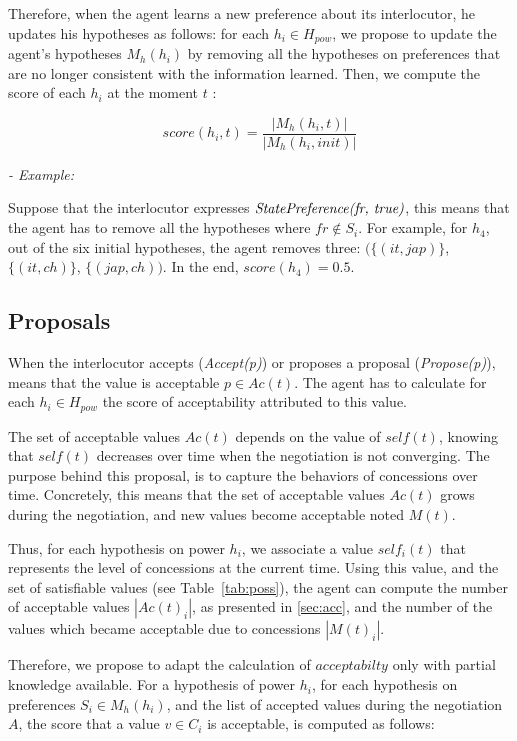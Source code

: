 \documentclass[conference, letterpaper]{IEEEtran}
\begin{document}
		Therefore, when the agent learns a new preference about its interlocutor, he updates his hypotheses as follows: 
		for each  $h_i \in H_{pow}$, we propose to update the agent's hypotheses $M_h(h_i)$ by removing all the hypotheses on preferences that are no longer consistent with the information learned. 
		Then, we compute the score of each $h_i$ at the moment $t$ :
		
		$$score(h_i,t) = \frac{|M_h(h_i, t)|}{|M_h(h_i, init)|}$$
		
		\textit{- Example:}
		
		Suppose that the interlocutor expresses $\emph{StatePreference(fr, true)}$, this means that the agent has to remove all the hypotheses where $fr \not\in S_i$. For example, for $h_4$, out of the six initial hypotheses, the agent removes three: $(\{(it,jap)\}$, $\{(it,ch)\}$, $\{(jap,ch))$. In the end, $score(h_4) = 0.5$. 
	
	
	\subsection{Proposals}
		When the interlocutor accepts (\emph{Accept(p)}) or proposes a proposal (\emph{Propose(p)}), means that the value is acceptable $p \in Ac(t)$. 
		The agent has to calculate for each $h_i \in H_{pow}$ the score of acceptability attributed to this value. 
		
		The set of acceptable values $Ac(t)$ depends on the value of $self(t)$, knowing that $self(t)$ decreases over time when the negotiation is not converging. The purpose behind this proposal, is to capture the behaviors of concessions over time. Concretely, this means that the set of acceptable values $Ac(t)$ grows during the negotiation, and new values become acceptable noted $M(t)$. 
		
		Thus, for each hypothesis on power $h_i$, we associate a value $self_i(t)$ that represents the level of concessions at the current time. Using this value, and the set of satisfiable values (see Table~\ref{tab:poss}), the agent can compute the number of acceptable values $|Ac(t)_i|$, as presented in \ref{sec:acc}, and the number of the values which became acceptable due to concessions $|M(t)_i|$.
		
		Therefore, we propose to adapt the calculation of $acceptabilty$ only with partial knowledge available. For a hypothesis of power $h_i$, for each hypothesis on preferences $S_i \in M_h(h_i)$, and the list of accepted values during the negotiation $A$, the score that a value $v \in C_i$ is acceptable, is computed as follows:
		
\end{document}
